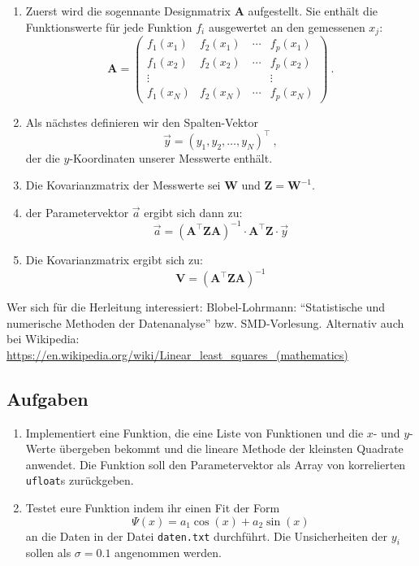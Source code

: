 \documentclass{scrartcl}
\begin{document}
\begin{enumerate}
  \item Zuerst wird die sogennante Designmatrix $\symbf{A}$ aufgestellt.
    Sie enthält die Funktionswerte für jede Funktion $f_i$ ausgewertet an den gemessenen $x_j$:
    \begin{equation}
      \symbf{A} =
      \begin{pmatrix}
        f_1(x_1) & f_2(x_1) & \cdots & f_p(x_1) \\
        f_1(x_2) & f_2(x_2) & \cdots & f_p(x_2) \\
        \vdots   &          &        &  \vdots  \\
        f_1(x_N) & f_2(x_N) & \cdots & f_p(x_N)
      \end{pmatrix} \ .
    \end{equation}
  \item Als nächstes definieren wir den Spalten-Vektor
    \begin{equation}
      \vec{y} = (y_1, y_2, …, y_N)^{\top} \ ,
    \end{equation}
    der die $y$-Koordinaten unserer Messwerte enthält.
  \item Die Kovarianzmatrix der Messwerte sei $\symbf{W}$ und $\symbf{Z} = \symbf{W}^{-1}$.
  \item der Parametervektor $\vec{a}$ ergibt sich dann zu:
    \begin{equation}
      \vec{a} = \left(\symbf{A}^\top \symbf{Z} \symbf{A}\right)^{-1} \cdot \symbf{A}^\top \symbf{Z} \cdot \vec{y}
    \end{equation}
  \item Die Kovarianzmatrix ergibt sich zu:
    \begin{equation}
      \symbf{V} = \left(\symbf{A}^\top \symbf{Z} \symbf{A}\right)^{-1}
    \end{equation}
\end{enumerate}
Wer sich für die Herleitung interessiert: Blobel-Lohrmann: \enquote{Statistische und numerische Methoden der Datenanalyse} bzw. SMD-Vorlesung.
Alternativ auch bei Wikipedia: \url{https://en.wikipedia.org/wiki/Linear_least_squares_(mathematics)}

\subsection*{Aufgaben}

\begin{enumerate}
  \item Implementiert eine Funktion, die eine Liste von Funktionen und die $x$- und $y$-Werte übergeben bekommt und die lineare Methode der kleinsten Quadrate anwendet.
    Die Funktion soll den Parametervektor als Array von korrelierten \texttt{ufloat}s zurückgeben.
  \item Testet eure Funktion indem ihr einen Fit der Form
    \begin{equation}
      \Psi(x) = a_1 \cos(x) + a_2 \sin(x)
    \end{equation}
    an die Daten in der Datei \texttt{daten.txt} durchführt.
    Die Unsicherheiten der $y_i$ sollen als $\sigma = \num{0.1}$ angenommen werden.
\end{enumerate}
\end{document}
